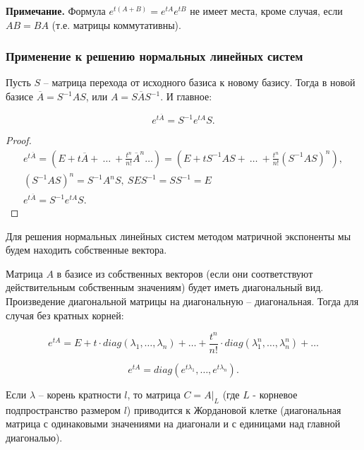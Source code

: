 \textbf{Примечание.} Формула $e^{t(A+B)} = e^{tA}e^{tB}$ не имеет места, кроме случая, если $AB = BA$ (т.е. матрицы коммутативны).

\subsubsection{Применение к решению нормальных линейных систем}

\begin{theorem}

Пусть $S$ -- матрица перехода от исходного базиса к новому базису. Тогда в новой базисе $\overline{A} = S^{-1}AS$, или $A = S\overline{A}S^{-1}$. И главное:

\[e^{t\overline{A}} = S^{-1}e^{tA}S.\]

\end{theorem}

\begin{proof}
	\begin{equation*}
		\begin{gathered}
 e^{t\overline{A}} = \left(E + t\overline{A} +\ \dots\ + \frac{t^{n}}{n!}\overline{A}^{n} \dots \right) = \left(E + tS^{-1}AS +\ \dots\ + \frac{t^{n}}{n!}(S^{-1}AS)^{n}\right), \\
 (S^{-1}AS)^n = S^{-1}A^nS,\ SES^{-1} = SS^{-1} = E \\
 e^{t\overline{A}} = S^{-1}e^{tA}S.
		\end{gathered}
	\end{equation*}
\end{proof}

Для решения нормальных линейных систем методом матричной экспоненты мы будем находить собственные вектора.

Матрица $A$ в базисе из собственных векторов (если они соответствуют действительным собственным значениям) будет иметь диагональный вид. Произведение диагональной матрицы на диагональную -- диагональная. Тогда для случая без кратных корней:

\[ e^{tA} = E + t\cdot diag(\lambda_1, \dots, \lambda_n) + \dots + \frac{t^n}{n!}\cdot diag(\lambda_1^n, \dots , \lambda_n^n) + \dots\]

\[ e^{tA} = diag(e^{t\lambda_1}, \dots, e^{t\lambda_n}).\]

Если $\lambda$ -- корень кратности $l$, то матрица $C = A|_{L}$ (где $L$ - корневое подпространство размером $l$)  приводится к Жордановой клетке (диагональная матрица с одинаковыми значениями на диагонали и с единицами над главной диагональю).

